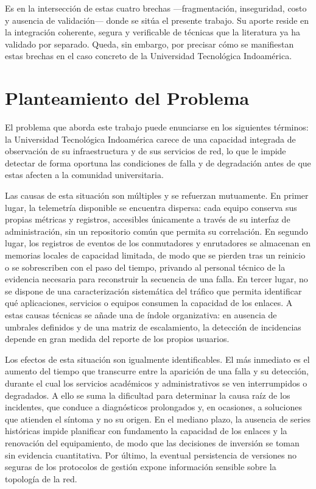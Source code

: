 Es en la intersección de estas cuatro brechas ---fragmentación, inseguridad, costo y ausencia de validación--- donde se sitúa el presente trabajo. Su aporte reside en la integración coherente, segura y verificable de técnicas que la literatura ya ha validado por separado. Queda, sin embargo, por precisar cómo se manifiestan estas brechas en el caso concreto de la Universidad Tecnológica Indoamérica.

\section{Planteamiento del Problema}
\label{sec:planteamiento}

El problema que aborda este trabajo puede enunciarse en los siguientes términos: la Universidad Tecnológica Indoamérica carece de una capacidad integrada de observación de su infraestructura y de sus servicios de red, lo que le impide detectar de forma oportuna las condiciones de falla y de degradación antes de que estas afecten a la comunidad universitaria.

Las causas de esta situación son múltiples y se refuerzan mutuamente. En primer lugar, la telemetría disponible se encuentra dispersa: cada equipo conserva sus propias métricas y registros, accesibles únicamente a través de su interfaz de administración, sin un repositorio común que permita su correlación. En segundo lugar, los registros de eventos de los conmutadores y enrutadores se almacenan en memorias locales de capacidad limitada, de modo que se pierden tras un reinicio o se sobrescriben con el paso del tiempo, privando al personal técnico de la evidencia necesaria para reconstruir la secuencia de una falla. En tercer lugar, no se dispone de una caracterización sistemática del tráfico que permita identificar qué aplicaciones, servicios o equipos consumen la capacidad de los enlaces. A estas causas técnicas se añade una de índole organizativa: en ausencia de umbrales definidos y de una matriz de escalamiento, la detección de incidencias depende en gran medida del reporte de los propios usuarios.

Los efectos de esta situación son igualmente identificables. El más inmediato es el aumento del tiempo que transcurre entre la aparición de una falla y su detección, durante el cual los servicios académicos y administrativos se ven interrumpidos o degradados. A ello se suma la dificultad para determinar la causa raíz de los incidentes, que conduce a diagnósticos prolongados y, en ocasiones, a soluciones que atienden el síntoma y no su origen. En el mediano plazo, la ausencia de series históricas impide planificar con fundamento la capacidad de los enlaces y la renovación del equipamiento, de modo que las decisiones de inversión se toman sin evidencia cuantitativa. Por último, la eventual persistencia de versiones no seguras de los protocolos de gestión expone información sensible sobre la topología de la red.

